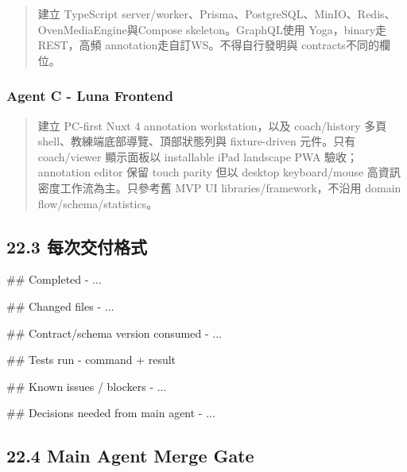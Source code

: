 \documentclass[
  9pt,
  a4paper,
]{article}
\newenvironment{Shaded}{}{}
\newcommand{\FunctionTok}[1]{\textcolor[rgb]{0.02,0.16,0.49}{#1}}
\newcommand{\NormalTok}[1]{#1}
\newcommand{\SpecialStringTok}[1]{\textcolor[rgb]{0.73,0.40,0.53}{#1}}
\begin{document}
\begin{quote}
建立 TypeScript
server/worker、Prisma、PostgreSQL、MinIO、Redis、OvenMediaEngine與Compose
skeleton。GraphQL使用 Yoga，binary走REST，高頻
annotation走自訂WS。不得自行發明與 contracts不同的欄位。
\end{quote}

\subsubsection{Agent C - Luna Frontend}\label{agent-c---luna-frontend}

\begin{quote}
建立 PC-first Nuxt 4 annotation workstation，以及 coach/history 多頁 shell、教練端底部導覽、頂部狀態列與 fixture-driven 元件。只有 coach/viewer 顯示面板以 installable iPad landscape PWA 驗收；annotation editor 保留 touch parity 但以 desktop keyboard/mouse 高資訊密度工作流為主。只參考舊 MVP UI libraries/framework，不沿用 domain flow/schema/statistics。
\end{quote}

\subsection{22.3
每次交付格式}\label{223-ux6bcfux6b21ux4ea4ux4ed8ux683cux5f0f}

\begin{Shaded}
\begin{Highlighting}[]
\FunctionTok{\#\# Completed}
\SpecialStringTok{{-} }\NormalTok{...}

\FunctionTok{\#\# Changed files}
\SpecialStringTok{{-} }\NormalTok{...}

\FunctionTok{\#\# Contract/schema version consumed}
\SpecialStringTok{{-} }\NormalTok{...}

\FunctionTok{\#\# Tests run}
\SpecialStringTok{{-} }\NormalTok{command + result}

\FunctionTok{\#\# Known issues / blockers}
\SpecialStringTok{{-} }\NormalTok{...}

\FunctionTok{\#\# Decisions needed from main agent}
\SpecialStringTok{{-} }\NormalTok{...}
\end{Highlighting}
\end{Shaded}

\subsection{22.4 Main Agent Merge Gate}\label{224-main-agent-merge-gate}
\end{document}
